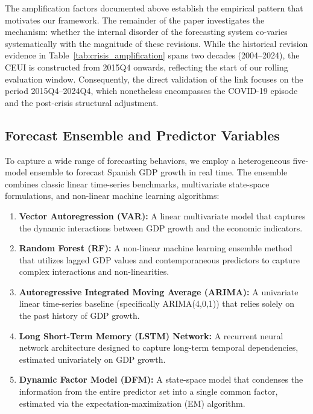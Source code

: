 \documentclass[12pt,a4paper]{article}
\theoremstyle{remark}
\begin{document}


The amplification factors documented above establish the empirical pattern that motivates our framework. The remainder of the paper investigates the mechanism: whether the internal disorder of the forecasting system co-varies systematically with the magnitude of these revisions. While the historical revision evidence in Table~\ref{tab:crisis_amplification} spans two decades (2004--2024), the CEUI is constructed from 2015Q4 onwards, reflecting the start of our rolling evaluation window. Consequently, the direct validation of the link focuses on the period 2015Q4--2024Q4, which nonetheless encompasses the COVID-19 episode and the post-crisis structural adjustment.

\subsection{Forecast Ensemble and Predictor Variables}
To capture a wide range of forecasting behaviors, we employ a heterogeneous five-model ensemble to forecast Spanish GDP growth in real time. The ensemble combines classic linear time-series benchmarks, multivariate state-space formulations, and non-linear machine learning algorithms:
\begin{enumerate}
    \item \textbf{Vector Autoregression (VAR):} A linear multivariate model that captures the dynamic interactions between GDP growth and the economic indicators.
    \item \textbf{Random Forest (RF):} A non-linear machine learning ensemble method that utilizes lagged GDP values and contemporaneous predictors to capture complex interactions and non-linearities.
    \item \textbf{Autoregressive Integrated Moving Average (ARIMA):} A univariate linear time-series baseline (specifically ARIMA(4,0,1)) that relies solely on the past history of GDP growth.
    \item \textbf{Long Short-Term Memory (LSTM) Network:} A recurrent neural network architecture designed to capture long-term temporal dependencies, estimated univariately on GDP growth.
    \item \textbf{Dynamic Factor Model (DFM):} A state-space model that condenses the information from the entire predictor set into a single common factor, estimated via the expectation-maximization (EM) algorithm.
\end{enumerate}
\end{document}
